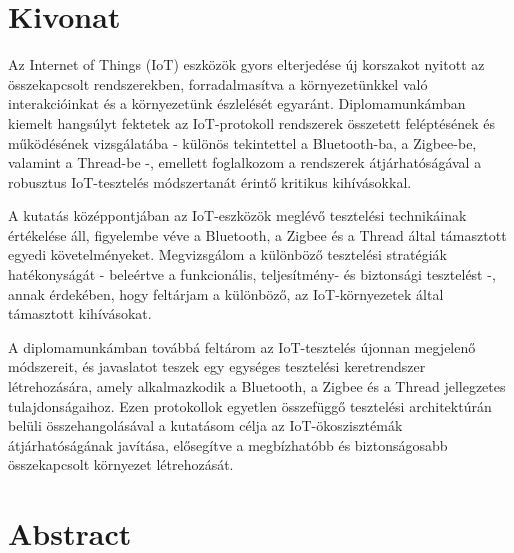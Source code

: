 \setcounter{page}{1}

\selecthungarian

\chapter*{Kivonat}

Az Internet of Things (IoT) eszközök gyors elterjedése új korszakot nyitott az összekapcsolt rendszerekben, forradalmasítva a környezetünkkel való interakcióinkat és a környezetünk észlelését egyaránt. Diplomamunkámban kiemelt hangsúlyt fektetek az IoT-protokoll rendszerek összetett feléptésének és működésének vizsgálatába - különös tekintettel a Bluetooth-ba, a Zigbee-be, valamint a Thread-be -, emellett foglalkozom a rendszerek átjárhatóságával a robusztus IoT-tesztelés módszertanát érintő kritikus kihívásokkal.

A kutatás középpontjában az IoT-eszközök meglévő tesztelési technikáinak értékelése áll, figyelembe véve a Bluetooth, a Zigbee és a Thread által támasztott egyedi követelményeket. Megvizsgálom a különböző tesztelési stratégiák hatékonyságát - beleértve a funkcionális, teljesítmény- és biztonsági tesztelést -,  annak érdekében, hogy feltárjam a különböző, az IoT-környezetek által támasztott kihívásokat.

A diplomamunkámban továbbá feltárom az IoT-tesztelés újonnan megjelenő módszereit, és javaslatot teszek egy egységes tesztelési keretrendszer létrehozására, amely alkalmazkodik a Bluetooth, a Zigbee és a Thread jellegzetes tulajdonságaihoz. Ezen protokollok egyetlen összefüggő tesztelési architektúrán belüli összehangolásával a kutatásom célja az IoT-ökoszisztémák átjárhatóságának javítása, elősegítve a megbízhatóbb és biztonságosabb összekapcsolt környezet létrehozását.


\vfill
\selectenglish


\chapter*{Abstract}

